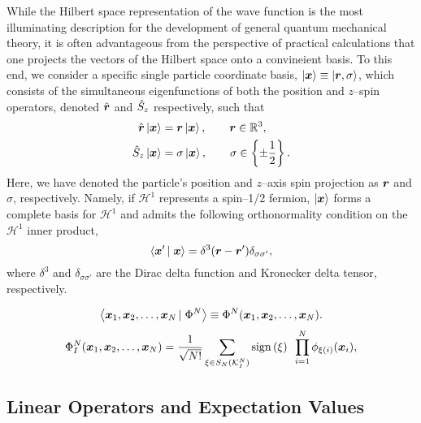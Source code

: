 While the Hilbert space representation of the wave function is the most illuminating description for the development of
general quantum mechanical theory, it is often advantageous from the perspective of practical calculations that one
projects the vectors of the Hilbert space onto a convineient basis. 
To this end, we consider a specific single particle coordinate basis, $\left\vert \boldsymbol{x} \right\rangle \equiv \left\vert \boldsymbol{r},\sigma \right\rangle$, 
which consists of the simultaneous eigenfunctions
of both the position and $z$--spin operators, denoted $\hat{\boldsymbol{r}}$ and $\hat{S}_z$ respectively,
such that
\begin{align}
  \hat{\boldsymbol{r}}\left\vert \boldsymbol{x} \right\rangle &= \boldsymbol{r}\left\vert \boldsymbol{x} \right\rangle, \qquad \boldsymbol{r}\in\mathbb{R}^3, \\
  \hat{S}_z\left\vert \boldsymbol{x} \right\rangle    &= \sigma\left\vert \boldsymbol{x} \right\rangle, \qquad \sigma \in \left \lbrace \pm\frac{1}{2} \right\rbrace.
\end{align}
Here, we have denoted the particle's position and $z$--axis spin projection as $\boldsymbol{r}$ and $\sigma$, respectively.
Namely, if $\mathcal{H}^1$ represents a spin--1/2 fermion, $\left\vert \boldsymbol{x} \right\rangle$ forms a complete basis for $\mathcal{H}^1$ 
and admits the following orthonormality  condition on the $\mathcal{H}^1$ inner product,
\begin{equation}
  \left\langle \boldsymbol{x}' \left\vert\right. \boldsymbol{x} \right\rangle = \delta^3(\boldsymbol{r} - \boldsymbol{r}')\delta_{\sigma\sigma'},
\end{equation}
where $\delta^3$ and $\delta_{\sigma\sigma'}$ are the Dirac delta function and Kronecker delta tensor, respectively.

\begin{equation}
  \left\langle \boldsymbol{x}_1,\boldsymbol{x}_2,\ldots,\boldsymbol{x}_N \left\vert\right. \Phi^N \right\rangle \equiv \Phi^N(\boldsymbol{x}_1,\boldsymbol{x}_2,\ldots,\boldsymbol{x}_N).
\end{equation}
\begin{equation}
  \label{eq:SlaterDetSpace}
  \Phi_I^N(\boldsymbol{x}_1,\boldsymbol{x}_2,\ldots,\boldsymbol{x}_N) = \frac{1}{\sqrt{N!}} \sum_{\xi \in S_N(\mathcal{K}^N_I)} \mathrm{sign}\left( \xi \right) \text{ } 
    \prod_{i = 1 }^N \phi_{\xi(i)}(\boldsymbol{x}_i),
\end{equation}

\subsection{Linear Operators and Expectation Values}
\label{sec:LO}

